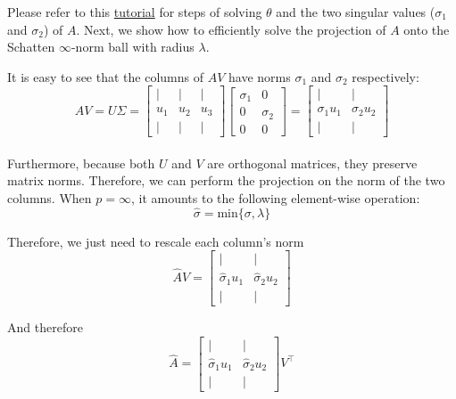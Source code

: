 \documentclass{article}
\begin{document}
Please refer to this \href{https://sites.ualberta.ca/~mlipsett/ENGM541/Readings/svd_ellis.pdf}{tutorial} for steps of solving \(\theta\) and the two singular values (\(\sigma_1\) and \(\sigma_2\)) of \(A\). Next, we show how to efficiently solve the projection of \(A\) onto the Schatten \(\infty\)-norm ball with radius \(\lambda\).

It is easy to see that the columns of \(A V\) have norms \(\sigma_1\) and \(\sigma_2\) respectively:\\
%
\[A V = U \Sigma =
\begin{bmatrix}
    \vert & \vert & \vert \\
    u_1   & u_2  & u_3  \\
    \vert & \vert & \vert
\end{bmatrix}
\begin{bmatrix}
    \sigma_1 & 0 \\
    0 & \sigma_2  \\
    0 & 0
\end{bmatrix} = 
\begin{bmatrix}
    \vert & \vert \\
    \sigma_1 u_1   & \sigma_2 u_2  \\
    \vert & \vert
\end{bmatrix}\]\\

Furthermore, because both \(U\) and \(V\) are orthogonal matrices, they preserve matrix norms. Therefore, we can perform the projection on the norm of the two columns. When \(p=\infty\), it amounts to the following element-wise operation:\\
%
\[\hat{\sigma} = \text{min}\{\sigma,\lambda\}\]

Therefore, we just need to rescale each column's norm\\
%
\[\hat{A} V =
\begin{bmatrix}
    \vert & \vert \\
    \hat{\sigma}_1 u_1   & \hat{\sigma}_2 u_2  \\
    \vert & \vert
\end{bmatrix}\]

And therefore\\
%
\[\hat{A} =
\begin{bmatrix}
    \vert & \vert \\
    \hat{\sigma}_1 u_1   & \hat{\sigma}_2 u_2  \\
    \vert & \vert
\end{bmatrix}
V^\top\]
\end{document}
